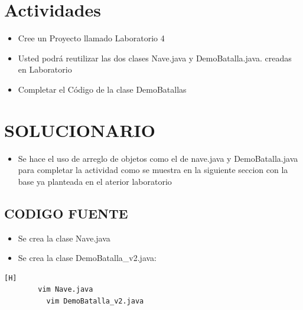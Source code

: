 \documentclass{article}
\begin{document}
	\section{Actividades}
	\begin{itemize}		
		\item Cree un Proyecto llamado Laboratorio 4
		\item  Usted podrá reutilizar las dos clases Nave.java y DemoBatalla.java. creadas en Laboratorio
		
		\item Completar el Código de la clase DemoBatallas
	\end{itemize}
		
	\section{SOLUCIONARIO}
	\begin{itemize}
		\item Se hace el uso de arreglo de objetos  como el de nave.java y DemoBatalla.java para completar la actividad como se muestra en la siguiente seccion  con la base ya planteada en el aterior laboratorio
	\end{itemize}

	\subsection{CODIGO FUENTE}
	\begin{itemize}	
		\item Se crea la clase Nave.java
			\item Se crea la clase DemoBatalla_v2.java:
	\end{itemize}	
		
	\begin{lstlisting}[language=bash,caption={Creando la clase Nave}][H]
		vim Nave.java
		  vim DemoBatalla_v2.java
	\end{lstlisting}
	
\end{document}
